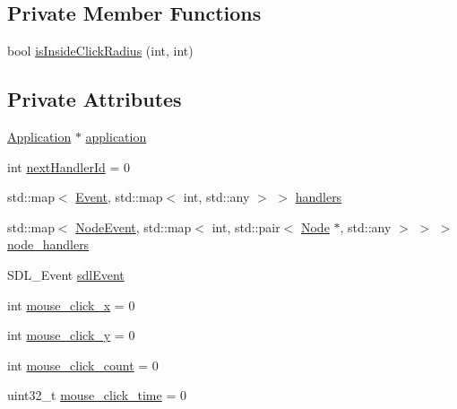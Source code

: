 \subsection*{Private Member Functions}
\begin{DoxyCompactItemize}
\item 
bool \mbox{\hyperlink{classsage_1_1EventDispatcher_a918e15fc278d82e1826c5da31b6cc897}{is\+Inside\+Click\+Radius}} (int, int)
\end{DoxyCompactItemize}
\subsection*{Private Attributes}
\begin{DoxyCompactItemize}
\item 
\mbox{\hyperlink{classsage_1_1Application}{Application}} $\ast$ \mbox{\hyperlink{classsage_1_1EventDispatcher_a0c9ea12254c6806bd4252e0e336e7c81}{application}}
\item 
int \mbox{\hyperlink{classsage_1_1EventDispatcher_a45a41623356399b6a9afa584762e1897}{next\+Handler\+Id}} = 0
\item 
std\+::map$<$ \mbox{\hyperlink{namespacesage_afe706a25026cc74fe69b56d53a265d29}{Event}}, std\+::map$<$ int, std\+::any $>$ $>$ \mbox{\hyperlink{classsage_1_1EventDispatcher_ad1e2836de57436c39769b2792f8d97ba}{handlers}}
\item 
std\+::map$<$ \mbox{\hyperlink{namespacesage_ad2c7b0e1ebf67f572d43620e6b07aa13}{Node\+Event}}, std\+::map$<$ int, std\+::pair$<$ \mbox{\hyperlink{classsage_1_1Node}{Node}} $\ast$, std\+::any $>$ $>$ $>$ \mbox{\hyperlink{classsage_1_1EventDispatcher_aefdb6a3e004a7bec95ae6f0845ba8d05}{node\+\_\+handlers}}
\item 
S\+D\+L\+\_\+\+Event \mbox{\hyperlink{classsage_1_1EventDispatcher_acc93b97b0ed92a64ab2e2040dc8ca04c}{sdl\+Event}}
\item 
int \mbox{\hyperlink{classsage_1_1EventDispatcher_a744f0db4a213a5e9d90316f991b10bcf}{mouse\+\_\+click\+\_\+x}} = 0
\item 
int \mbox{\hyperlink{classsage_1_1EventDispatcher_abf2ef4959095c77e28cd363b53d0cab2}{mouse\+\_\+click\+\_\+y}} = 0
\item 
int \mbox{\hyperlink{classsage_1_1EventDispatcher_ab66ab2cbe57fd5a7d04c130a25e042dd}{mouse\+\_\+click\+\_\+count}} = 0
\item 
uint32\+\_\+t \mbox{\hyperlink{classsage_1_1EventDispatcher_ae59ac77950d2ab74ad826220fa147ec7}{mouse\+\_\+click\+\_\+time}} = 0
\end{DoxyCompactItemize}


